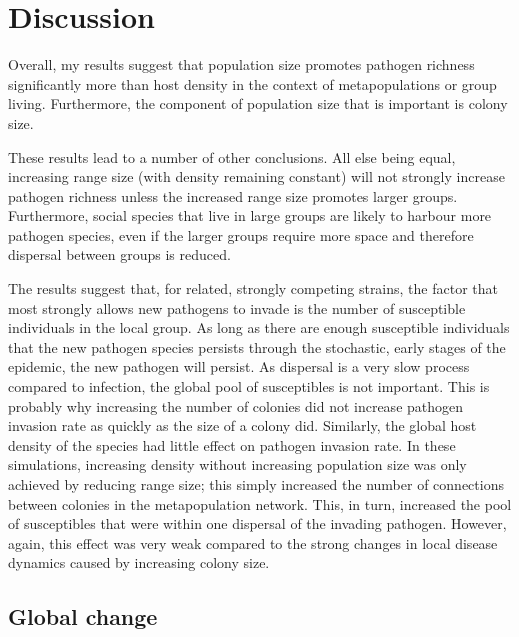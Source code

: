\section{Discussion}



Overall, my results suggest that population size promotes pathogen richness significantly more than host density in the context of metapopulations or group living.
Furthermore, the component of population size that is important is colony size.

These results lead to a number of other conclusions.
All else being equal, increasing range size (with density remaining constant) will not strongly increase pathogen richness unless the increased range size promotes larger groups.
Furthermore, social species that live in large groups are likely to harbour more pathogen species, even if 
the larger groups require more space and therefore dispersal between groups is reduced.


The results suggest that, for related, strongly competing strains, the factor that most strongly allows new pathogens to invade is the number of susceptible individuals in the local group.
As long as there are enough susceptible individuals that the new pathogen species persists through the stochastic, early stages of the epidemic, the new pathogen will persist.
As dispersal is a very slow process compared to infection, the global pool of susceptibles is not important. 
This is probably why increasing the number of colonies did not increase pathogen invasion rate as quickly as the size of a colony did.
Similarly, the global host density of the species had little effect on pathogen invasion rate.
In these simulations, increasing density without increasing population size was only achieved by reducing range size; this simply increased the number of connections between colonies in the metapopulation network.
This, in turn, increased the pool of susceptibles that were within one dispersal of the invading pathogen.
However, again, this effect was very weak compared to the strong changes in local disease dynamics caused by increasing colony size.



\subsection{Global change}

